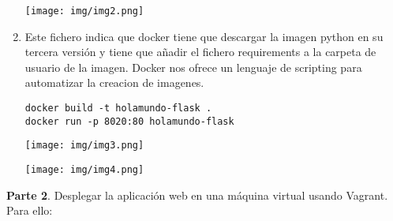 \documentclass{article}
\begin{document}
\begin{enumerate}
\begin{center}
\texttt{[image: img/img2.png]} 
\end{center}
\item Este fichero indica que docker tiene que descargar la imagen python en su tercera versión y tiene que añadir el fichero requirements a la carpeta de usuario de la imagen. Docker nos ofrece un lenguaje de scripting para automatizar la creacion de imagenes.
\lstset{language=C, breaklines=true, basicstyle=\footnotesize}
\begin{lstlisting}[frame=single]
docker build -t holamundo-flask .
docker run -p 8020:80 holamundo-flask
\end{lstlisting}
\begin{center}
\texttt{[image: img/img3.png]} 
\end{center}
\begin{center}
\texttt{[image: img/img4.png]} 
\end{center}

\end{enumerate}



\newpage
\textbf{Parte 2}. Desplegar la aplicación web en una máquina virtual usando Vagrant. Para ello:
\end{document}
